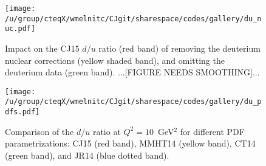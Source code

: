 \documentclass[aps,prd,amsmath,preprint]{revtex4}
\begin{document}
\begin{figure}[t]
\texttt{[image: /u/group/cteqX/wmelnitc/CJgit/sharespace/codes/gallery/du\_nuc.pdf]}
\caption{Impact on the CJ15 $d/u$ ratio (red band) of removing the
	deuterium nuclear corrections (yellow shaded band),
	and omitting the deuterium data (green band).
	{\color{red}...[FIGURE NEEDS SMOOTHING]...}}
\label{fig:du_nuc}
\end{figure} 


\begin{figure}[t]
\texttt{[image: /u/group/cteqX/wmelnitc/CJgit/sharespace/codes/gallery/du\_pdfs.pdf]}
\caption{Comparison of the $d/u$ ratio at $Q^2=10$~GeV$^2$ for different
	PDF parametrizations:
	CJ15 (red band),
	MMHT14 \cite{MMHT14} (yellow band),
	CT14 \cite{CT14} (green band), and
	JR14 \cite{JR14} (blue dotted band).}
\label{fig:du_pdfs}
\end{figure} 
\end{document}
